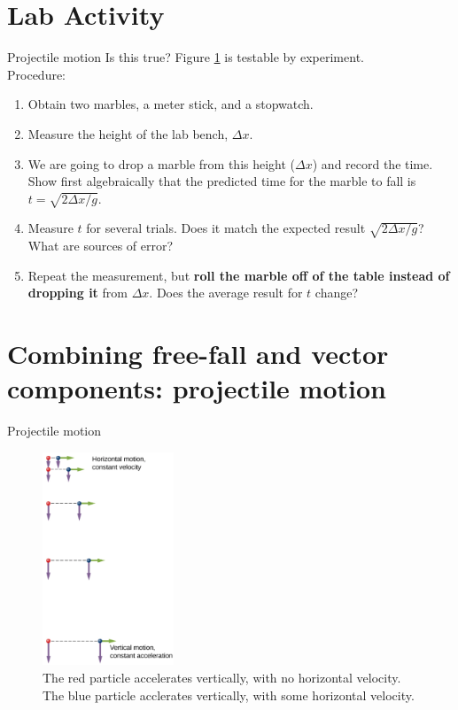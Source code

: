 \documentclass{beamer}
\begin{document}
\section{Lab Activity}

\begin{frame}{Projectile motion}
Is this true?  Figure \ref{fig:fall} is testable by experiment. \\
\vspace{0.5cm}
\small
Procedure:
\begin{enumerate}
\item Obtain two marbles, a meter stick, and a stopwatch.
\item Measure the height of the lab bench, $\Delta x$.
\item We are going to drop a marble from this height ($\Delta x$) and record the time.  Show first algebraically that the predicted time for the marble to fall is $t = \sqrt{2\Delta x/g}$.
\item Measure $t$ for several trials.  Does it match the expected result $\sqrt{2\Delta x/g}$?  What are sources of error?
\item Repeat the measurement, but \textbf{roll the marble off of the table instead of dropping it} from $\Delta x$.  Does the average result for $t$ change?
\end{enumerate}
\end{frame}

\section{Combining free-fall and vector components: projectile motion}

\begin{frame}{Projectile motion}
\small
\begin{figure}
\centering
\includegraphics[width=0.35\textwidth]{figures/fall.png}
\caption{\label{fig:fall} The red particle accelerates vertically, with no horizontal velocity.  The blue particle acclerates vertically, with some horizontal velocity.}
\end{figure}
\end{frame}
\end{document}
